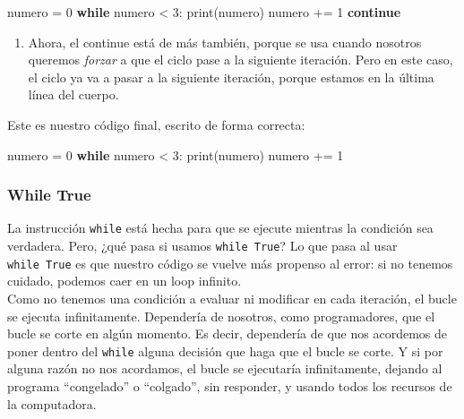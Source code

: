 \documentclass[
  letterpaper,
  DIV=11,
  numbers=noendperiod]{scrreprt}
\newenvironment{Shaded}{\begin{snugshade}}{\end{snugshade}}
\newcommand{\BuiltInTok}[1]{\textcolor[rgb]{0.00,0.23,0.31}{#1}}
\newcommand{\ControlFlowTok}[1]{\textcolor[rgb]{0.00,0.23,0.31}{\textbf{#1}}}
\newcommand{\DecValTok}[1]{\textcolor[rgb]{0.68,0.00,0.00}{#1}}
\newcommand{\NormalTok}[1]{\textcolor[rgb]{0.00,0.23,0.31}{#1}}
\newcommand{\OperatorTok}[1]{\textcolor[rgb]{0.37,0.37,0.37}{#1}}
\providecommand{\tightlist}{%
  \setlength{\itemsep}{0pt}\setlength{\parskip}{0pt}}\usepackage{longtable,booktabs,array}
\begin{document}
\begin{Shaded}
\begin{Highlighting}[]
\NormalTok{numero }\OperatorTok{=} \DecValTok{0} 
\ControlFlowTok{while}\NormalTok{ numero }\OperatorTok{\textless{}} \DecValTok{3}\NormalTok{:}
  \BuiltInTok{print}\NormalTok{(numero)}
\NormalTok{  numero }\OperatorTok{+=} \DecValTok{1}
  \ControlFlowTok{continue}
\end{Highlighting}
\end{Shaded}

\begin{enumerate}
\def\labelenumi{\arabic{enumi}.}
\setcounter{enumi}{1}
\tightlist
\item
  Ahora, el continue está de más también, porque se usa cuando nosotros
  queremos \emph{forzar} a que el ciclo pase a la siguiente iteración.
  Pero en este caso, el ciclo ya va a pasar a la siguiente iteración,
  porque estamos en la última línea del cuerpo.
\end{enumerate}

Este es nuestro código final, escrito de forma correcta:

\begin{Shaded}
\begin{Highlighting}[]
\NormalTok{numero }\OperatorTok{=} \DecValTok{0} 
\ControlFlowTok{while}\NormalTok{ numero }\OperatorTok{\textless{}} \DecValTok{3}\NormalTok{:}
  \BuiltInTok{print}\NormalTok{(numero)}
\NormalTok{  numero }\OperatorTok{+=} \DecValTok{1}
\end{Highlighting}
\end{Shaded}

\subsubsection{While True}\label{while-true}

La instrucción \texttt{while} está hecha para que se ejecute mientras la
condición sea verdadera. Pero, ¿qué pasa si usamos \texttt{while\ True}?
Lo que pasa al usar \texttt{while\ True} es que nuestro código se vuelve
más propenso al error: si no tenemos cuidado, podemos caer en un loop
infinito.\\

Como no tenemos una condición a evaluar ni modificar en cada iteración,
el bucle se ejecuta infinitamente. Dependería de nosotros, como
programadores, que el bucle se corte en algún momento. Es decir,
dependería de que nos acordemos de poner dentro del \texttt{while}
alguna decisión que haga que el bucle se corte. Y si por alguna razón no
nos acordamos, el bucle se ejecutaría infinitamente, dejando al programa
``congelado'' o ``colgado'', sin responder, y usando todos los recursos
de la computadora.
\end{document}
